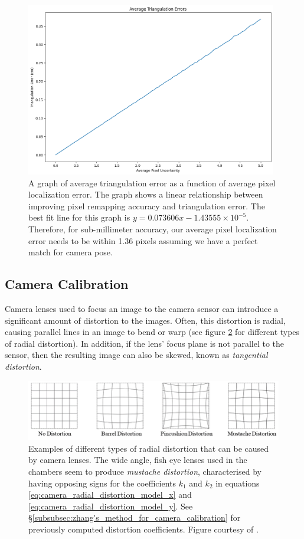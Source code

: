 \documentclass[11pt, letterpaper]{extarticle} %
\begin{document}
\begin{figure}
    \centering
    \includegraphics[height=3in]{average_triangulation_error_based_on_pixel_localization_error.png}
    \caption{A graph of average triangulation error as a function of average pixel localization error. The graph shows a linear relationship between improving pixel remapping accuracy and triangulation error. The best fit line for this graph is $y = 0.073606x - 1.43555\times 10^{-5}$. Therefore, for sub-millimeter accuracy, our average pixel localization error needs to be within 1.36 pixels assuming we have a perfect match for camera pose.}
    \label{fig:pixel_remapping_error_on_triangulation_accuracy}
\end{figure}

\subsection{Camera Calibration} \label{subsec:camera_calibration}
Camera lenses used to focus an image to the camera sensor can introduce a significant amount of distortion to the images. Often, this distortion is radial, causing parallel lines in an image to bend or warp (see figure \ref{fig:radial_distortion_examples} for different types of radial distortion). In addition, if the lens' focus plane is not parallel to the sensor, then the resulting image can also be skewed, known as \textit{tangential distortion}. 

\begin{figure}[h]
    \centering
    \includegraphics[width=0.9\linewidth]{radial_distortion_examples.png}
    \caption{Examples of different types of radial distortion that can be caused by camera lenses. The wide angle, fish eye lenses used in the chambers seem to produce \textit{mustache distortion}, characterised by having opposing signs for the coefficients $k_1$ and $k_2$ in equations \ref{eq:camera_radial_distortion_model_x} and \ref{eq:camera_radial_distortion_model_y}. See \S\ref{subsubsec:zhang's_method_for_camera_calibration} for previously computed distortion coefficients. Figure courtesy of \cite{fan2020computer}.}
    \label{fig:radial_distortion_examples}
\end{figure}
\end{document}
